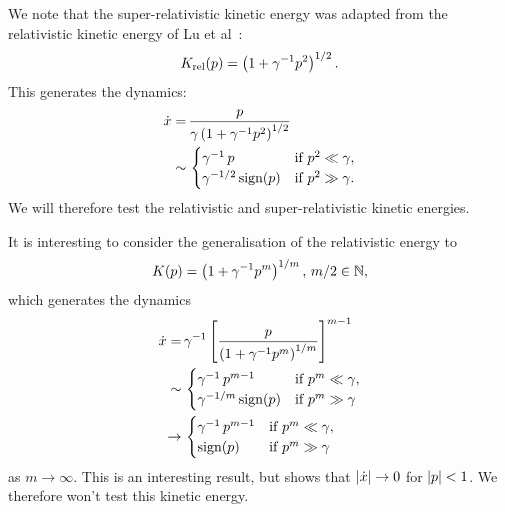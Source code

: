 \documentclass[a4paper]{article}
\begin{document}
We note that the super-relativistic kinetic energy was adapted from the relativistic kinetic energy of Lu et al~\cite{Lu2017Relativistic}:
\begin{align}
K_{\rm rel}(p) = \left( 1 + \gamma^{-1} p^2 \right)^{1 / 2} .
\end{align}
This generates the dynamics:
\begin{align}
\dot{x} =& \, \frac{p}{\gamma \left( 1 + \gamma^{-1} p^2 \right)^{1/2}} \nonumber \\
\sim & \,
\begin{cases} 
\gamma^{-1} \, p &\text{if} \,\, p^2 \ll \gamma , \\
\gamma^{-1 / 2} \, \text{sign}(p) &\text{if} \,\, p^2 \gg \gamma .
\end{cases} 
\end{align}
We will therefore test the relativistic and super-relativistic kinetic energies.

It is interesting to consider the generalisation of the relativistic energy to 
\begin{align}
K(p) = \left( 1 + \gamma^{-1} p^m \right)^{1 / m} , \, m / 2 \in \mathbb{N} ,
\end{align}
which generates the dynamics 
\begin{align}
\dot{x} =& \, \gamma^{-1} \left[ \frac{p}{\left( 1 + \gamma^{-1} p^m \right)^{1/m}} \right]^{m - 1} \nonumber \\
\sim & \,
\begin{cases} 
\gamma^{-1} \, p^{m - 1}  &\text{if} \,\, p^m \ll \gamma , \\
\gamma^{-1 / m} \, \text{sign}(p) &\text{if} \,\, p^m \gg \gamma 
\end{cases} \\
\to & \,
\begin{cases} 
\gamma^{-1} \, p^{m - 1}  &\text{if} \,\, p^m \ll \gamma , \\
\text{sign}(p) &\text{if} \,\, p^m \gg \gamma 
\end{cases} 
\end{align}
as $m \to \infty$. This is an interesting result, but shows that $\left| \dot{x} \right| \to 0$ for $\left| p \right| < 1$. We therefore won't test this kinetic energy. 
\end{document}
